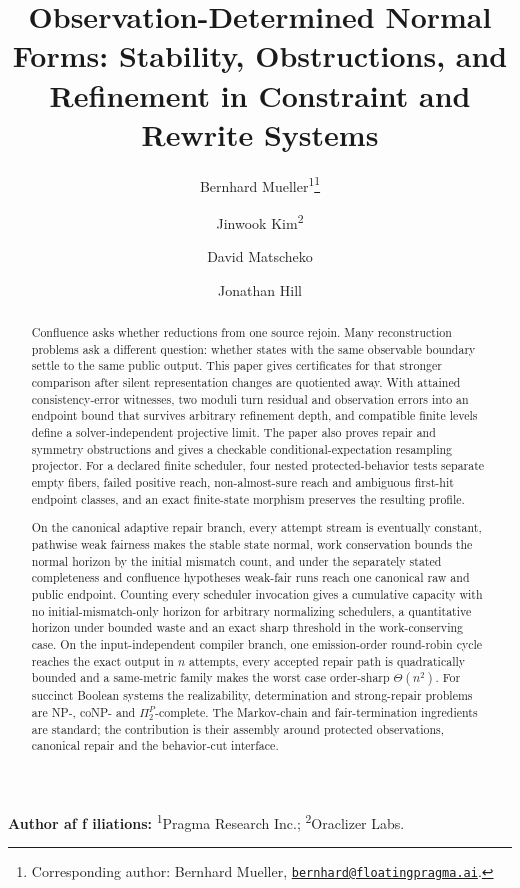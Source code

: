 \documentclass[11pt]{article}
\title{\textbf{Observation-Determined Normal Forms: Stability, Obstructions, and Refinement in Constraint and Rewrite Systems}}
\author{Bernhard Mueller\textsuperscript{1}\thanks{Corresponding author: Bernhard Mueller,
\href{mailto:bernhard@floatingpragma.ai}{\texttt{bernhard@floatingpragma.ai}}.}
\and Jinwook Kim\textsuperscript{2} \and David Matscheko \and Jonathan Hill}
\date{\OPHPaperReleaseDate}
\theoremstyle{definition}
\theoremstyle{remark}
\numberwithin{equation}{section}
\begin{document}
\maketitle
\OPHPaperReleaseBanner

\begin{center}
\small\textbf{Author af\kern0pt f\kern0pt iliations:} \textsuperscript{1}Pragma Research Inc.; \textsuperscript{2}Oraclizer Labs.
\end{center}

\begin{abstract}
Confluence asks whether reductions from one source rejoin. Many reconstruction
problems ask a different question: whether states with the same observable
boundary settle to the same public output. This paper gives certificates for
that stronger comparison after silent representation changes are quotiented
away. With attained consistency-error witnesses, two moduli turn residual
and observation errors into an endpoint bound that survives arbitrary
refinement depth, and compatible finite levels
define a solver-independent projective limit. The paper also proves repair
and symmetry obstructions and gives a checkable conditional-expectation
resampling projector. For a declared finite scheduler, four nested
protected-behavior tests separate empty fibers, failed positive reach,
non-almost-sure reach and ambiguous first-hit endpoint classes, and an exact
finite-state morphism preserves the resulting profile.

On the canonical adaptive repair branch, every attempt stream is eventually
constant, pathwise weak fairness makes the stable state normal, work
conservation bounds the normal horizon by the initial mismatch count, and
under the separately stated completeness and confluence hypotheses weak-fair
runs reach one canonical raw and public endpoint. Counting every scheduler
invocation gives a cumulative capacity with no initial-mismatch-only horizon
for arbitrary normalizing schedulers, a quantitative horizon under bounded
waste and an exact sharp threshold in the work-conserving case. On the
input-independent compiler branch, one emission-order round-robin cycle
reaches the exact output in \(n\) attempts, every accepted repair path is
quadratically bounded and a same-metric family makes the worst case
order-sharp \(\Theta(n^2)\). For succinct Boolean systems the realizability,
determination and strong-repair problems are NP-, coNP- and
\(\Pi_2^P\)-complete. The Markov-chain and fair-termination ingredients are
standard; the contribution is their assembly around protected observations,
canonical repair and the behavior-cut interface.
\end{abstract}
\end{document}
